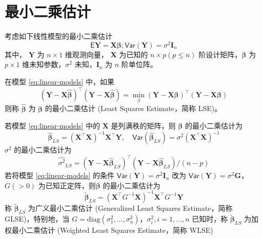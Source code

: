 \documentclass[12pt,a4paper,UTF8,twoside]{book}
\theoremstyle{definition}
\theoremstyle{definition}
\theoremstyle{definition}
\theoremstyle{remark}
\let\BeginKnitrBlock\begin \let\EndKnitrBlock\end
\begin{document}
\hypertarget{sec:lse}{%
\section{最小二乘估计}\label{sec:lse}}

考虑如下线性模型的最小二乘估计 \begin{equation}
\mathsf{E}\mathbf{Y} = \mathbf{X}\boldsymbol{\beta}; \mathsf{Var}(\mathbf{Y}) = \sigma^2 \mathbf{I}_{n} \label{eq:linear-models}
\end{equation} \noindent 其中， \(\mathbf{Y}\) 为 \(n \times 1\)
维观测向量， \(\mathbf{X}\) 为已知的 \(n \times p (p \leq n)\)
阶设计矩阵，\(\boldsymbol{\beta}\) 为 \(p \times 1\)
维未知参数，\(\sigma^2\) 未知，\(\mathbf{I}_{n}\) 为 \(n\) 阶单位阵。
\BeginKnitrBlock{definition}[最小二乘估计]
\protect\hypertarget{def:least-squares-estimate}{}{\label{def:least-squares-estimate}
{} }在模型 \eqref{eq:linear-models} 中，如果
\begin{equation}
(\mathbf{Y} - \mathbf{X}\hat{\boldsymbol{\beta}})^{\top}(\mathbf{Y} - \mathbf{X}\hat{\boldsymbol{\beta}}) = \min_{\beta}(\mathbf{Y} - \mathbf{X}\boldsymbol{\beta})^{\top}(\mathbf{Y} - \mathbf{X}\boldsymbol{\beta}) \label{eq:least-squares}
\end{equation} \noindent 则称 \(\hat{\boldsymbol{\beta}}\) 为
\(\boldsymbol{\beta}\) 的最小二乘估计 (Least Squares Estimate，简称
LSE)。
\EndKnitrBlock{definition}

\BeginKnitrBlock{theorem}[最小二乘估计]
\protect\hypertarget{thm:unbiased}{}{\label{thm:unbiased}
{} }若模型 \eqref{eq:linear-models} 中的
\(\mathbf{X}\) 是列满秩的矩阵，则 \(\boldsymbol{\beta}\)
的最小二乘估计为 \[
\hat{\boldsymbol{\beta}}_{LS} = ( \mathbf{X}^{\top}\mathbf{X} )^{-1}\mathbf{X}^{\top} \mathbf{Y}, \quad  \mathsf{Var}(\hat{\boldsymbol{\beta}}_{LS}) = \sigma^2 (\mathbf{X}^{\top}\mathbf{X})^{-1}  
\] \noindent \(\sigma^2\) 的最小二乘估计为 \[
\hat{\sigma^2}_{LS} = (\mathbf{Y} - \mathbf{X}\hat{\boldsymbol{\beta}}_{LS})^{\top}(\mathbf{Y} - \mathbf{X}\hat{\boldsymbol{\beta}}_{LS})/(n - p)
\] 若将模型 \eqref{eq:linear-models} 的条件
\(\mathsf{Var}(\mathbf{Y}) = \sigma^2 \mathbf{I}_{n}\) 改为
\(\mathsf{Var}(\mathbf{Y}) = \sigma^2 \mathbf{G}\)， \(G(>0)\)
为已知正定阵，则\(\boldsymbol{\beta}\) 的最小二乘估计为 \[
\tilde{\boldsymbol{\beta}}_{LS} = ( \mathbf{X}^{\top} G^{-1} \mathbf{X})^{-1} \mathbf{X}^{\top} G^{-1} \mathbf{Y} 
\] \noindent 称 \(\tilde{\boldsymbol{\beta}}_{LS}\) 为广义最小二乘估计
(Generalized Least Squares Estimate，简称 GLSE)，特别地，当
\(G = \mathrm{diag}(\sigma^2_{1},\ldots,\sigma^2_{n})\)，\(\sigma^2_{i},i = 1,\ldots,n\)
已知时，称 \(\tilde{\boldsymbol{\beta}}_{LS}\) 为加权最小二乘估计
(Weighted Least Squares Estimate，简称 WLSE)\citep{wang2004}
\EndKnitrBlock{theorem}
\end{document}
